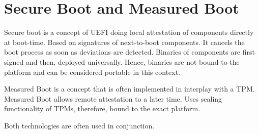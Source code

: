 

\section{Secure Boot and Measured Boot}

Secure boot is a concept of UEFI doing local attestation of components directly at boot-time. Based on signatures of next-to-boot components. It cancels the boot process as soon as deviations are detected. Binaries of components are first signed and then, deployed universally. Hence, binaries are not bound to the platform and can be considered portable in this context.

Measured Boot is a concept that is often implemented in interplay with a TPM. Measured Boot allows remote attestation to a later time. Uses sealing functionality of TPMs, therefore, bound to the exact platform.

Both technologies are often used in conjunction.
